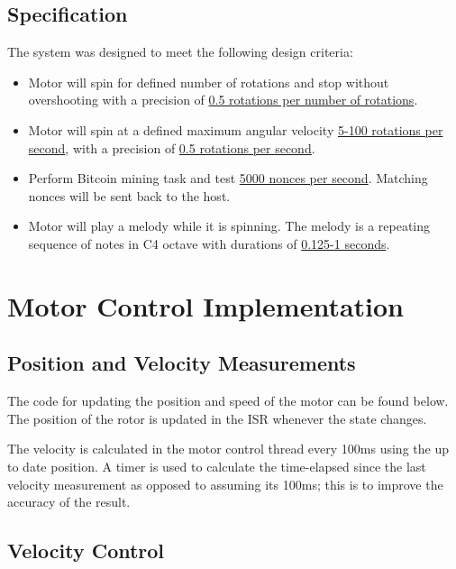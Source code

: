 \documentclass{article}
\begin{document}
\subsection{Specification}
\noindent The system was designed to meet the following design criteria:
 \begin{itemize}
	\item Motor will spin for defined number of rotations and stop without overshooting with a precision of \underline{0.5 rotations per number of rotations}.
	\item Motor will spin at a defined maximum angular velocity \underline{5-100 rotations per second}, with a precision of \underline{0.5 rotations per second}.
	\item Perform Bitcoin mining task and test \underline{5000 nonces per second}. Matching nonces will be sent back to the host.
	\item Motor will play a melody while it is spinning. The melody is a repeating sequence of notes in C4 octave with durations of \underline{0.125-1 seconds}.
\end{itemize}





\section{Motor Control Implementation}
\subsection{Position and Velocity Measurements}

\noindent
The code for updating the position and speed of the motor can be found below. The position of the rotor is updated in the ISR whenever the state changes.

\noindent
The velocity is calculated in the motor control thread every 100ms using the up to date position. A timer is used to calculate the time-elapsed since the last velocity measurement as opposed to assuming its 100ms; this is to improve the accuracy of the result.

\bigskip





\subsection{Velocity Control}
\end{document}
